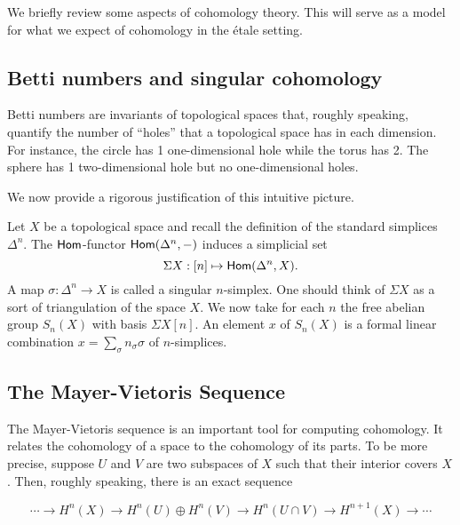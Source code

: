 We briefly review some aspects of cohomology theory. This will serve as a model for what we expect of cohomology in the \'etale setting.

\subsection{Betti numbers and singular cohomology}
Betti numbers are invariants of topological spaces that, roughly speaking, quantify the number of ``holes'' that a topological space has in each dimension. For instance, the circle has 1 one-dimensional hole while the torus has 2. The sphere has 1 two-dimensional hole but no one-dimensional holes. 

We now provide a rigorous justification of this intuitive picture.

Let $X$ be a topological space and recall the definition of the standard simplices $\Delta^n$. The $\mathsf{Hom}$-functor $\mathsf{Hom}(\Delta^n, -)$ induces a simplicial set
\[\Sigma X: [n] \mapsto \mathsf{Hom}(\Delta^n, X).\]
A map $\sigma : \Delta^n \to X$ is called a singular $n$-simplex. One should think of $\Sigma X$ as a sort of triangulation of the space $X$. We now take for each $n$ the free abelian group $S_n(X)$ with basis $\Sigma X[n]$. An element $x$ of $S_n(X)$ is a formal linear combination $x = \sum_\sigma n_\sigma \sigma$ of $n$-simplices. 

%
%
\subsection{The Mayer-Vietoris Sequence}

The Mayer-Vietoris sequence is an important tool for computing cohomology. It relates the cohomology of a space to the cohomology of its parts. To be more precise, suppose $U$ and $V$ are two subspaces of $X$ such that their interior covers $X$. Then, roughly speaking, there is an exact sequence

\[
\cdots \to H^n(X) \to H^n(U) \oplus  H^n(V) \to H^n(U\cap V) \to H^{n+1}(X) \to \cdots
\]

